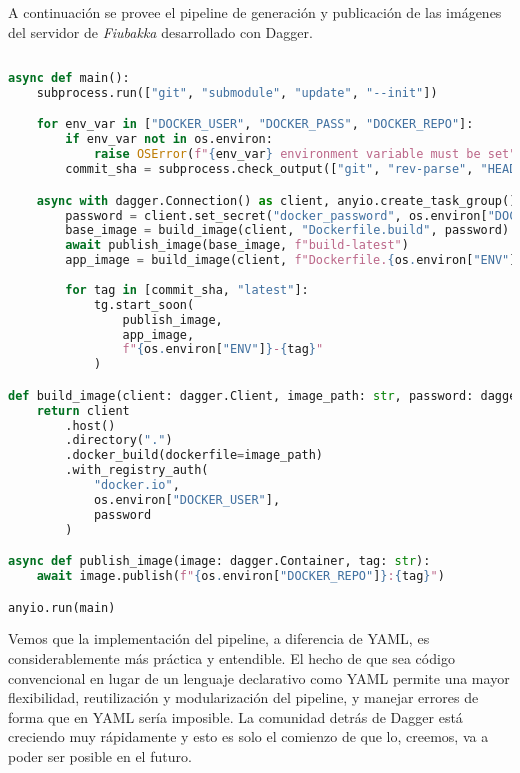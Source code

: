 A continuación se provee el pipeline de generación y publicación de las imágenes del servidor de \textit{Fiubakka} desarrollado con Dagger.

\begin{lstlisting}[language=Python, caption={\textbf{Pipeline de construcción y publicación de las imágenes de Docker}}]
    
async def main():
    subprocess.run(["git", "submodule", "update", "--init"])

    for env_var in ["DOCKER_USER", "DOCKER_PASS", "DOCKER_REPO"]:
        if env_var not in os.environ:
            raise OSError(f"{env_var} environment variable must be set")
        commit_sha = subprocess.check_output(["git", "rev-parse", "HEAD"]).strip().decode("utf-8")[:7]

    async with dagger.Connection() as client, anyio.create_task_group() as tg:
        password = client.set_secret("docker_password", os.environ["DOCKER_PASS"])
        base_image = build_image(client, "Dockerfile.build", password)
        await publish_image(base_image, f"build-latest")
        app_image = build_image(client, f"Dockerfile.{os.environ["ENV"]}", password)
        
        for tag in [commit_sha, "latest"]:
            tg.start_soon(
                publish_image,
                app_image,
                f"{os.environ["ENV"]}-{tag}"
            )

def build_image(client: dagger.Client, image_path: str, password: dagger.Secret):
    return client
        .host()
        .directory(".")
        .docker_build(dockerfile=image_path)
        .with_registry_auth(
            "docker.io",
            os.environ["DOCKER_USER"],
            password
        )

async def publish_image(image: dagger.Container, tag: str):
    await image.publish(f"{os.environ["DOCKER_REPO"]}:{tag}")

anyio.run(main)

\end{lstlisting}

Vemos que la implementación del pipeline, a diferencia de YAML, es considerablemente más práctica y entendible. El hecho de que sea código convencional
en lugar de un lenguaje declarativo como YAML permite una mayor flexibilidad, reutilización y modularización del pipeline, y manejar errores de forma que en YAML
sería imposible. La comunidad detrás de Dagger está creciendo muy rápidamente y esto es solo el comienzo de que lo, creemos, va a poder ser posible en el futuro.
